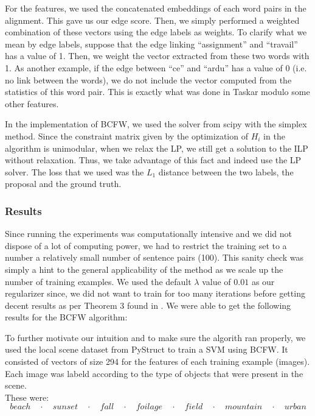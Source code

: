 For the features, we used the concatenated embeddings of each word pairs in the
alignment. This gave us our edge score. Then, we simply performed a weighted
combination of these vectors using the edge labels as weights. To clarify what
we mean by edge labels, suppose that the edge linking ``assignment'' and
``travail'' has a value of 1. Then, we weight the vector extracted from these
two words with 1. As another example, if the edge between ``ce'' and ``ardu''
has a value of 0 (i.e. no link between the words), we do not include the vector
computed from the statistics of this word pair. This is exactly what was done in
Taskar \cite{taskarStructuredPredictionExtragradient} modulo some other
features.

\clearpage
In the implementation of BCFW, we used the solver from scipy with the simplex
method. Since the constraint matrix given by the optimization of $H_i$ in the
algorithm is unimodular, when we relax the LP, we still get a solution to the
ILP without relaxation. Thus, we take advantage of this fact and indeed use the
LP solver. The loss that we used was the $L_1$ distance between the two labels,
the proposal and the ground truth.

\subsubsection{Results}
Since running the experiments was computationally intensive and we did not
dispose of a lot of computing power, we had to restrict the training set to a
number a relatively small number of sentence pairs (100). This sanity check was
simply a hint to the general applicability of the method as we scale up the
number of training examples. We used the default $\lambda$ value of $0.01$ as
our regularizer since, we did not want to train for too many iterations before
getting decent results as per Theorem 3 found in
\citet{lacoste-julienBlockCoordinateFrankWolfeOptimization2013}. We were able to
get the following results for the BCFW algorithm:


To further motivate our intuition and to make sure the algorith ran properly, we
used the local scene dataset \cite{JMLR:v15:mueller14a} from PyStruct to train a
SVM using BCFW. It consisted of vectors of size 294 for the features of each
training example (images). Each image was labeld according to the type of
objects that were present in the scene.\\
These were:
\begin{equation}
  beach \quad\cdot\quad sunset \quad\cdot\quad fall \quad\cdot\quad foilage \quad\cdot\quad field
  \quad\cdot\quad mountain  \quad\cdot\quad urban
\end{equation}

